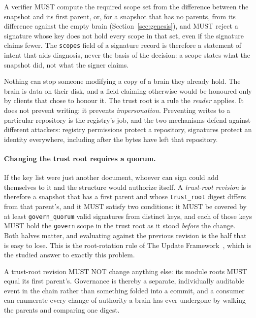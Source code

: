 \documentclass[11pt,a4paper]{article}
\begin{document}
A verifier MUST compute the required scope set from the difference between the
snapshot and its first parent, or, for a snapshot that has no parents, from its
difference against the empty brain (Section~\ref{sec:genesis}), and MUST reject a
signature whose key does not hold every scope in that set, even if the signature
claims fewer. The \texttt{scopes} field of a signature record is therefore a statement of
intent that aids diagnosis, never the basis of the decision: a scope states
what the snapshot did, not what the signer claims.

\begin{callout}[title=The trust root is not access control]
Nothing can stop someone modifying a copy of a brain they already hold. The
brain is data on their disk, and a field claiming otherwise would be honoured
only by clients that chose to honour it. The trust root is a rule the
\emph{reader} applies. It does not prevent writing; it prevents
\emph{impersonation}. Preventing writes to a particular repository is the
registry's job, and the two mechanisms defend against different attackers:
registry permissions protect a repository, signatures protect an identity
everywhere, including after the bytes have left that repository.
\end{callout}

\paragraph{Changing the trust root requires a quorum.}
If the key list were just another document, whoever can sign could add
themselves to it and the structure would authorize itself. A \emph{trust-root
revision} is therefore a snapshot that has a first parent and whose
\texttt{trust\_root} digest differs from that parent's, and it MUST satisfy two
conditions: it MUST be covered by at
least \texttt{govern\_quorum} valid signatures from distinct keys, and each of
those keys MUST hold the \texttt{govern} scope in the trust root as it stood
\emph{before} the change. Both halves matter, and evaluating against the
previous revision is the half that is easy to lose. This is the root-rotation
rule of The Update Framework~\cite{samuel2010tuf}, which is the studied answer
to exactly this problem.

A trust-root revision MUST NOT change anything else: its module roots MUST equal
its first parent's. Governance is thereby a separate, individually auditable
event in the chain rather than something folded into a commit, and a consumer can
enumerate every change of authority a brain has ever undergone by walking the
parents and comparing one digest.
\end{document}
